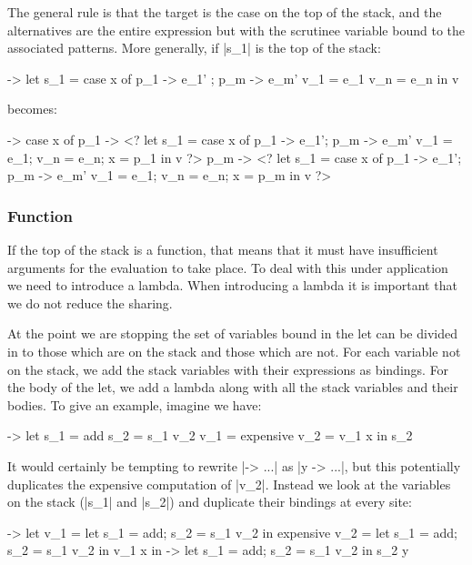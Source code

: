 \documentclass[draft]{sigplanconf}
\begin{document}
The general rule is that the target is the case on the top of the stack, and the alternatives are the entire expression but with the scrutinee variable bound to the associated patterns. More generally, if |s_1| is the top of the stack:

\begin{code}
\free ->  let  s_1  = case x of p_1 -> e_1' ; p_m -> e_m'
               v_1  = e_1
               v_n  = e_n
          in   v
\end{code}

\noindent becomes:

\begin{code}
\free -> case x of
    p_1 -> <? let  s_1 = case x of p_1 -> e_1'; p_m -> e_m'
                   v_1 = e_1; v_n = e_n; x = p_1 in v ?>
    p_m -> <? let  s_1 = case x of p_1 -> e_1'; p_m -> e_m'
                   v_1 = e_1; v_n = e_n; x = p_m in v ?>
\end{code}

\subsubsection{Function}

If the top of the stack is a function, that means that it must have insufficient arguments for the evaluation to take place. To deal with this under application we need to introduce a lambda. When introducing a lambda it is important that we do not reduce the sharing.

At the point we are stopping the set of variables bound in the let can be divided in to those which are on the stack and those which are not. For each variable not on the stack, we add the stack variables with their expressions as bindings. For the body of the let, we add a lambda along with all the stack variables and their bodies. To give an example, imagine we have:

\begin{code}
\x ->  let  s_1 = add
            s_2 = s_1 v_2
            v_1 = expensive
            v_2 = v_1 x
       in   s_2
\end{code}

It would certainly be tempting to rewrite |\x -> ...| as |\x y -> ...|, but this potentially duplicates the expensive computation of |v_2|. Instead we look at the variables on the stack (|s_1| and |s_2|) and duplicate their bindings at every site:

\begin{code}
\x ->  let  v_1 =  let s_1 = add; s_2 = s_1 v_2 in expensive
            v_2 =  let s_1 = add; s_2 = s_1 v_2 in v_1 x
       in   \y ->  let s_1 = add; s_2 = s_1 v_2 in s_2 y
\end{code}
\end{document}
